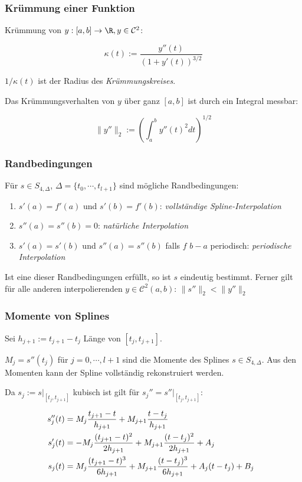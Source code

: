 \subsubsection*{Krümmung einer Funktion}

Krümmung von $y : [a,b] \rightarrow \R, y \in \mathcal{C}^2$:

$$\kappa(t) := \frac{y''(t)}{(1+y'(t))^{3/2}}$$

$1/\kappa(t)$ ist der Radius des \emph{Krümmungskreises}.

Das Krümmungsverhalten von $y$ über ganz $[a,b]$ ist durch ein Integral messbar:

$$\|y''\|_2 := \left(\int_a^b y''(t)^2 dt\right)^{1/2}$$

\subsubsection*{Randbedingungen}

Für $s \in S_{4,\Delta}$, $\Delta = \{t_0,\cdots,t_{l+1}\}$ sind mögliche Randbedingungen:

\begin{enumerate}[label=(\alph*)]
	\item $s'(a) = f'(a)$ und $s'(b)=f'(b)$: \emph{vollständige Spline-Interpolation}
	\item $s''(a) = s''(b) = 0$: \emph{natürliche Interpolation}
	\item $s'(a) = s'(b)$ und $s''(a) = s''(b)$ falls $f$ $b-a$ periodisch: \emph{periodische Interpolation}
\end{enumerate}

Ist eine dieser Randbedingungen erfüllt, so ist $s$ eindeutig bestimmt. Ferner gilt für alle anderen interpolierenden $y \in \mathcal{C}^2(a,b)$: $\|s''\|_2 < \|y''\|_2$

\subsubsection*{Momente von Splines}

Sei $h_{j+1} := t_{j+1} - t_j$ Länge von $[t_j,t_{j+1}]$.

$M_j = s''(t_j)$ für $j = 0, \cdots, l+1$ sind die Momente des Splines $s \in S_{4,\Delta}$. Aus den Momenten kann der Spline vollständig rekonstruiert werden.

Da $s_j := s|_{[t_j,t_{j+1}]}$ kubisch ist gilt für $s_j'' = s''|_{[t_j,t_{j+1}]}$:


\begin{align*}
\hspace{-2mm} s_j''(t) &= M_j \frac{t_{j+1}-t}{h_{j+1}} + M_{j+1} \frac{t-t_j}{h_{j+1}} \\
\hspace{-2mm} s_j'(t)  &= -M_j \frac{(t_{j+1} - t)^2}{2h_{j+1}} + M_{j+1} \frac{(t-t_j)^2}{2h_{j+1}} + A_j \\
\hspace{-2mm} s_j(t)   &= M_j \frac{(t_{j+1} - t)^3}{6h_{j+1}} + M_{j+1} \frac{(t-t_j)^3}{6h_{j+1}} + A_j(t-t_j) + B_j
\end{align*}

